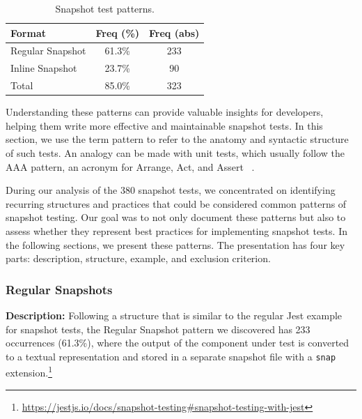 \documentclass[
	msc, %
	english %
]{../ppgccufmg}
\begin{document}
        \hspace{1pt}
        \begin{table}[!ht]
        \centering
        \begin{tabular}{p{5cm}S[table-format=2.1]S[table-format=3]}
            \toprule
            \textbf{Format} & {\textbf{Freq (\%)}} & {\textbf{Freq (abs)}} \\
            \midrule
            Regular Snapshot & 61.3\% & 233 \\
            Inline Snapshot  & 23.7\% & 90  \\
            Total            & 85.0\% & 323 \\
            \bottomrule
        \end{tabular}
        \caption{Snapshot test patterns.}
        \label{tab:patterns}
        \end{table}

        Understanding these patterns can provide valuable insights for developers, helping them write more effective and maintainable snapshot tests. In this section, we use the term pattern to refer to the anatomy and syntactic structure of such tests. An analogy can be made with unit tests, which usually follow the AAA pattern, an acronym for Arrange, Act, and Assert ~\cite{khorikov2020unit}.
        
        During our analysis of the 380 snapshot tests, we concentrated on identifying recurring structures and practices that could be considered common patterns of snapshot testing. Our goal was to not only document these patterns but also to assess whether they represent best practices for implementing snapshot tests. In the following sections, we present these patterns. The presentation has four key parts: description, structure, example, and exclusion criterion.


        \subsubsection{Regular Snapshots}

        \noindent\textbf{Description:} Following a structure that is similar to the regular Jest example for snapshot tests, the Regular Snapshot pattern we discovered has 233 occurrences (61.3\%), where the output of the component under test is converted to a textual representation and stored in a separate snapshot file with a \texttt{snap} extension.\footnote{\url{https://jestjs.io/docs/snapshot-testing\#snapshot-testing-with-jest}}\\
\end{document}
